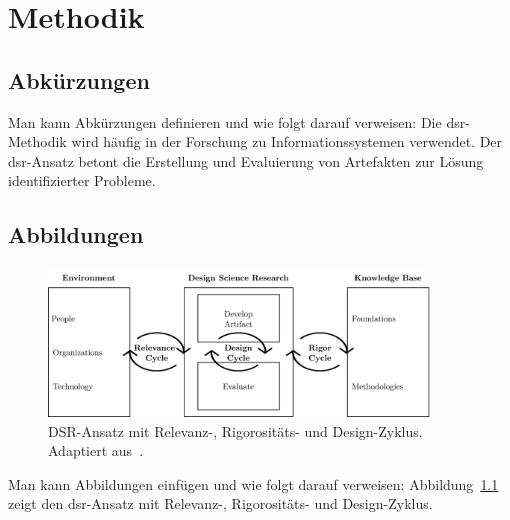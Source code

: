 \chapter{Methodik}
\label{chap:methodology}

\section{Abkürzungen}

Man kann Abkürzungen definieren und wie folgt darauf verweisen: Die \gls{dsr}-Methodik wird häufig in der Forschung zu Informationssystemen verwendet. Der \gls{dsr}-Ansatz betont die Erstellung und Evaluierung von Artefakten zur Lösung identifizierter Probleme.

\section{Abbildungen}

\begin{figure}[htbp!]
    \centering
    \includegraphics[width=0.9\textwidth]{figures/design-science-generic.png}
    \caption[DSR-Ansatz mit Relevanz-, Rigorositäts- und Design-Zyklus.]{DSR-Ansatz mit Relevanz-, Rigorositäts- und Design-Zyklus. Adaptiert aus~\textcite{hevner2004design}.}
    \label{fig:design-science-generic}
\end{figure}

Man kann Abbildungen einfügen und wie folgt darauf verweisen: Abbildung~\ref{fig:design-science-generic} zeigt den \gls{dsr}-Ansatz mit Relevanz-, Rigorositäts- und Design-Zyklus.
